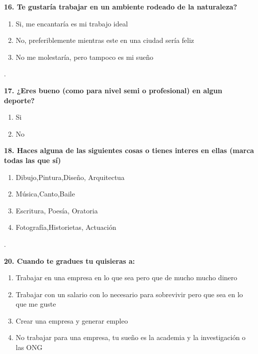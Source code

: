 \documentclass{article}
\begin{document}
\textbf{16. Te gustaría trabajar en un ambiente rodeado de la naturaleza?}
\begin{enumerate}[label=(\Alph*)]
\item Si, me encantaría es mi trabajo ideal
\item No, preferiblemente mientras este en una ciudad sería feliz
\item No me molestaría, pero tampoco es mi sueño
 \end{enumerate}. 


\textbf{17. ¿Eres bueno (como para nivel semi o profesional) en algun deporte?}
\begin{enumerate}[label=(\Alph*)]
\item Si
\item No 
\end{enumerate} 

\textbf{18. Haces alguna de las siguientes cosas o tienes interes en ellas (marca todas las que sí) } 
\begin{enumerate}[label=(\Alph*)]
\item Dibujo,Pintura,Diseño, Arquitectua
\item Música,Canto,Baile
\item Escritura, Poesía, Oratoria
\item Fotografía,Historietas, Actuación
\end{enumerate}.

\textbf{20. Cuando te gradues tu quisieras a:}
\begin{enumerate}[label=(\Alph*)]
\item Trabajar en una empresa en lo que sea pero que de mucho mucho dinero
\item Trabajar con un salario con lo necesario para sobrevivir pero que sea en lo que me guste
\item Crear una empresa y generar empleo
\item No trabajar para una empresa, tu sueño es la academia y la investigación o las ONG 
 \end{enumerate}  
\end{document}
